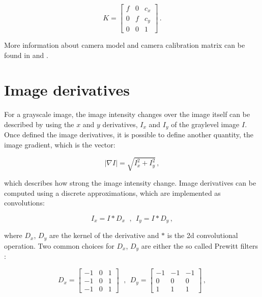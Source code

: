 \begin{equation*}
  K = \begin{bmatrix}
    f & 0 & c_x \\
    0 & f & c_y \\
    0 & 0 & 1
  \end{bmatrix} \,.
\end{equation*}

More information about camera model and camera calibration matrix can be found in \cite{10.5555/861369} and \cite{Pollefeys2004}.

\section{Image derivatives}\label{sec:imagegradient}
For a grayscale image, the image intensity changes over the image itself can be described by using the $x$ and $y$ derivatives, $I_x$ and $I_y$ of the graylevel image $I$.
Once defined the image derivatives, it is possible to define another quantity, the image gradient, which is the vector:

\begin{equation*}
  |\nabla I| = \sqrt{I_x^2 + I_y^2} \,,
\end{equation*}

which describes how strong the image intensity change. Image derivatives can be computed using a discrete approximations, which are implemented as convolutions:

\begin{equation*}
  I_x = I * D_x \ \ \,, \ \ I_y = I * D_y \,,
\end{equation*}

where $D_x$, $D_y$ are the kernel of the derivative and $*$ is the \acrshort{2d} convolutional operation. Two common choices for $D_x$, $D_y$ are either the so called Prewitt filters :

\begin{equation*}
  D_x = \begin{bmatrix}
    -1 & 0 & 1 \\
    -1 & 0 & 1 \\
    -1 & 0 & 1
  \end{bmatrix} \ \ \,,  \ \
  D_y = \begin{bmatrix}
    -1 & -1 & -1 \\
    0  & 0  & 0  \\
    1  & 1  & 1
  \end{bmatrix}\,,
\end{equation*}

